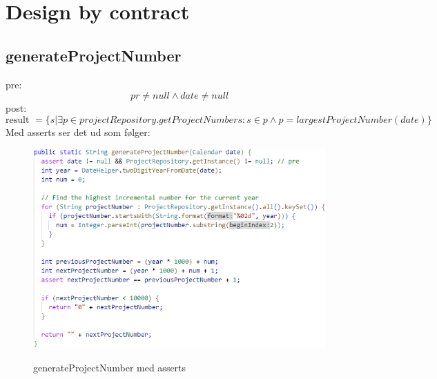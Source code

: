 \section{Design by contract}\label{chap:design_by_contract}

\subsection{generateProjectNumber} \label{sec:contract_generate_project_number}
pre: 
\begin{equation}
    pr \neq null \land date \neq null
\end{equation}
post:
\begin{equation}
    \text{result }=\{s|\exists p \in projectRepository.getProjectNumbers : s \in p \land p = largestProjectNumber(date)\}
\end{equation}
Med asserts ser det ud som følger:
\begin{figure}[H]
    \centering
    \caption{generateProjectNumber med asserts}
    \includegraphics[width = 14cm, keepaspectratio]{ImplementationAndTest/Diagrams/contract_generateProjectNumber.png}
    \label{fig:contract_generateProjectNumber}
\end{figure}

